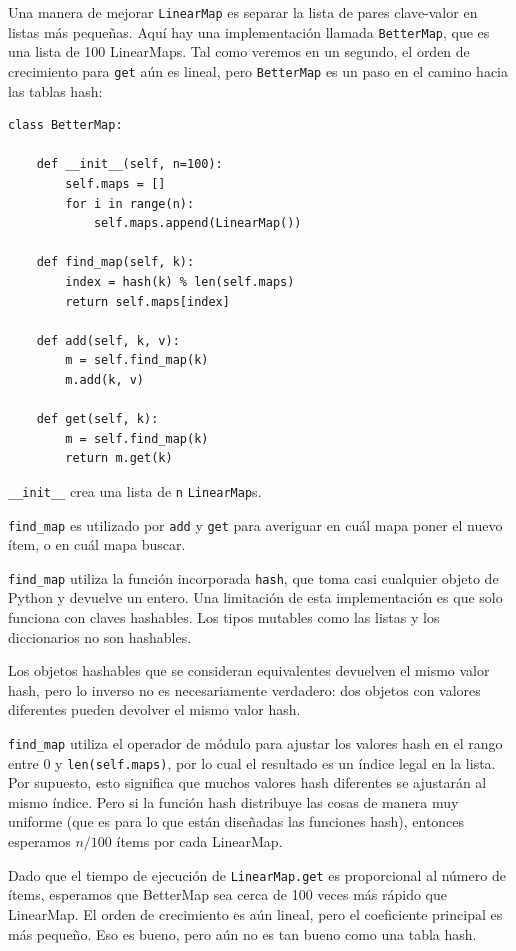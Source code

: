 \documentclass[10pt]{book}
\begin{document}
Una manera de mejorar {\tt LinearMap} es separar la lista de pares clave-valor
en listas más pequeñas.  Aquí hay una implementación llamada
{\tt BetterMap}, que es una lista de 100 LinearMaps.  Tal como veremos
en un segundo, el orden de crecimiento para {\tt get} aún es lineal,
pero {\tt BetterMap} es un paso en el camino hacia las tablas hash:

\begin{verbatim}
class BetterMap:

    def __init__(self, n=100):
        self.maps = []
        for i in range(n):
            self.maps.append(LinearMap())

    def find_map(self, k):
        index = hash(k) % len(self.maps)
        return self.maps[index]

    def add(self, k, v):
        m = self.find_map(k)
        m.add(k, v)

    def get(self, k):
        m = self.find_map(k)
        return m.get(k)
\end{verbatim}

\verb"__init__" crea una lista de {\tt n} {\tt LinearMap}s.

\verb"find_map" es utilizado por
{\tt add} y {\tt get}
para averiguar en cuál mapa poner el
nuevo ítem, o en cuál mapa buscar.

\verb"find_map" utiliza la función incorporada {\tt hash}, que toma
casi cualquier objeto de Python y devuelve un entero.  Una limitación de esta
implementación es que solo funciona con claves hashables.  Los tipos
mutables como las listas y los diccionarios no son hashables.

Los objetos hashables que se consideran equivalentes devuelven el mismo valor
hash, pero lo inverso no es necesariamente verdadero: dos objetos con
valores diferentes pueden devolver el mismo valor hash.

\verb"find_map" utiliza el operador de módulo para ajustar los valores hash
en el rango entre 0 y {\tt len(self.maps)}, por lo cual el resultado es un índice
legal en la lista.  Por supuesto, esto significa que muchos valores
hash diferentes se ajustarán al mismo índice.  Pero si la función hash
distribuye las cosas de manera muy uniforme (que es para lo que están diseñadas
las funciones hash), entonces esperamos $n/100$ ítems por cada LinearMap.

Dado que el tiempo de ejecución de {\tt LinearMap.get} es proporcional al
número de ítems, esperamos que BetterMap sea cerca de 100 veces más rápido
que LinearMap.  El orden de crecimiento es aún lineal, pero el
coeficiente principal es más pequeño.  Eso es bueno, pero aún no es
tan bueno como una tabla hash.
\end{document}
